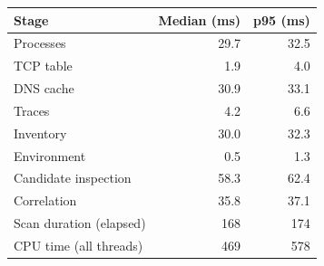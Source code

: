 \begin{tabular}{@{}l r r@{}}
\toprule
Stage & Median (ms) & p95 (ms) \\
\midrule
Processes & 29.7 & 32.5 \\
TCP table & 1.9 & 4.0 \\
DNS cache & 30.9 & 33.1 \\
Traces & 4.2 & 6.6 \\
Inventory & 30.0 & 32.3 \\
Environment & 0.5 & 1.3 \\
Candidate inspection & 58.3 & 62.4 \\
Correlation & 35.8 & 37.1 \\
\midrule
Scan duration (elapsed) & 168 & 174 \\
CPU time (all threads) & 469 & 578 \\
\bottomrule
\end{tabular}
